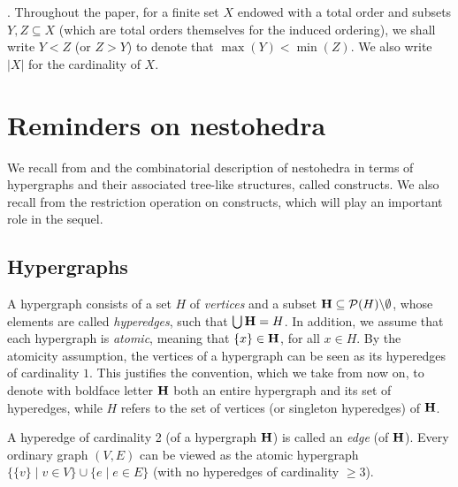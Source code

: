 \documentclass{article}
\theoremstyle{plain}
\theoremstyle{definition}
\newcommand{\inc}{\subseteq}
\newcommand{\union}{\cup}
\newcommand{\Union}{\bigcup}
\newcommand{\set}[1]{\{#1\}}
\newcommand{\setc}[2]{\set{#1 \mid #2}}
\newcommand{\hyper}[1]{{\bf #1}}
\begin{document}
\medskip

.
 Throughout the paper, for a finite set $X$ endowed with a total order and subsets $Y,Z\inc X$ (which are total orders themselves for the induced ordering), we shall write $Y <Z$ (or $Z>Y$) to denote that $\max(Y)<\min(Z)$. We also write $|X|$ for the cardinality of $X$. 

\section{Reminders on nestohedra} \label{nestohedra-reminders-section}

We recall from \cite{COI} and \cite{DP} the combinatorial description of nestohedra in terms of hypergraphs and their associated tree-like structures, called constructs. We also recall from \cite{PLBJ1} the restriction operation on constructs, which will play an important role in the sequel.


\subsection{Hypergraphs} \label{hypergraphs-subsection}
A hypergraph consists of a set $H$ of {\em vertices} and a subset 
$\hyper{H}\inc {\mathcal{P}}(H)\backslash\emptyset$, whose elements are called {\em hyperedges}, such that $\Union \hyper{H}=H$. In addition, we assume that each hypergraph is {\em atomic}, meaning that 
 $\set{x}\in \hyper{H}$, for all $x\in H$. By the atomicity assumption, the vertices of a hypergraph can be seen as its hyperedges of 
 cardinality $1$. This justifies the convention, which we take from now on, to denote with boldface letter ${\bf H}$ both an entire hypergraph and its set of hyperedges, while $H$ refers to the set of vertices (or singleton hyperedges) of ${\bf H}$.

\smallskip

 A hyperedge of cardinality 2 (of a hypergraph ${\bf H}$) is called an {\em edge} (of ${\bf H}$). Every ordinary graph $(V,E)$ can be viewed as the atomic hypergraph
$\setc{\set{v}}{v\in V} \union \setc{e}{e\in E}$ (with no hyperedges of cardinality $\geq 3$). 
\end{document}

